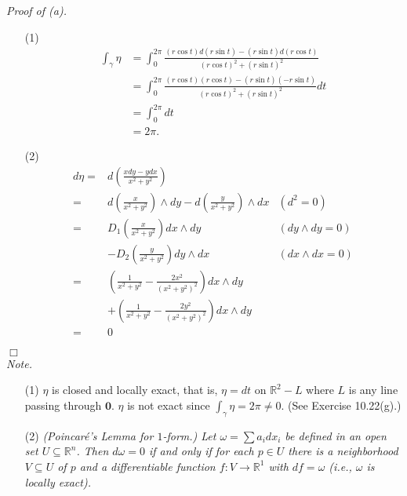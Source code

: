 \documentclass{article}
\begin{document}
\emph{Proof of (a).}
\begin{enumerate}
\item[(1)]
  \begin{align*}
    \int_{\gamma} \eta
    &= \int_{0}^{2\pi}
      \frac{(r\cos t) d(r\sin t) - (r\sin t) d(r\cos t)}{(r\cos t)^2 + (r\sin t)^2} \\
    &= \int_{0}^{2\pi}
      \frac{(r \cos t)(r \cos t) - (r\sin t) (-r\sin t)}{(r\cos t)^2 + (r\sin t)^2} dt \\
    &= \int_{0}^{2\pi} dt \\
    &= 2\pi.
  \end{align*}

\item[(2)]
  \begin{align*}
    d \eta
    =& d \left( \frac{x dy - y dx}{x^2+y^2} \right) \\
    =& d \left( \frac{x}{x^2+y^2} \right) \wedge dy
      - d \left( \frac{y}{x^2+y^2} \right) \wedge dx
      &(d^2 = 0) \\
    =& D_1\left(\frac{x}{x^2+y^2}\right) dx \wedge dy
      &(dy \wedge dy = 0) \\
      &- D_2\left(\frac{y}{x^2+y^2}\right) dy \wedge dx
      &(dx \wedge dx = 0) \\
    =& \left(\frac{1}{x^2+y^2} - \frac{2x^2}{(x^2+y^2)^2}\right) dx \wedge dy \\
      &+ \left(\frac{1}{x^2+y^2} - \frac{2y^2}{(x^2+y^2)^2}\right) dx \wedge dy \\
    =& 0
  \end{align*}
\end{enumerate}
$\Box$ \\



\emph{Note.}
\begin{enumerate}
\item[(1)]
  $\eta$ is closed and locally exact, that is,
  $\eta = dt$ on $\mathbb{R}^2 - L$
  where $L$ is any line passing through $\mathbf{0}$.
  $\eta$ is not exact since $\int_{\gamma} \eta = 2\pi \neq 0$.
  (See Exercise 10.22(g).)

\item[(2)]
  \emph{(Poincar\'e's Lemma for $1$-form.)
  Let $\omega = \sum a_i dx_i$ be defined in an open set $U \subseteq \mathbb{R}^n$.
  Then $d\omega = 0$ if and only if for each $p \in U$ there is a neighborhood $V \subseteq U$
  of $p$ and a differentiable function $f: V \to \mathbb{R}^1$ with
  $df = \omega$ (i.e., $\omega$ is locally exact).} \\
\end{enumerate}
\end{document}
